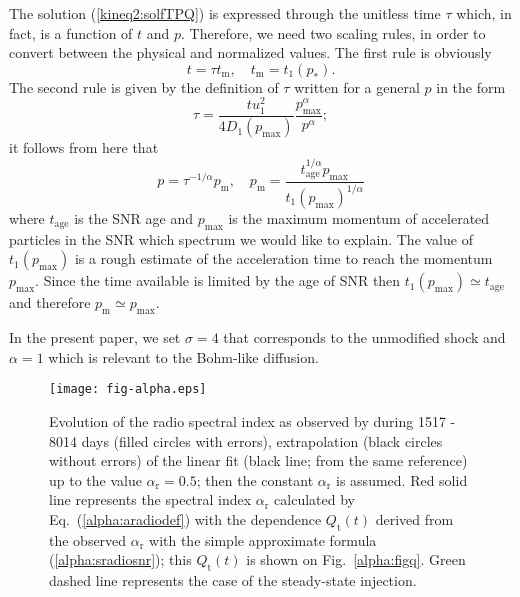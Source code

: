 \documentclass{aa}
\newcommand\rs[1]{_\mathrm{#1}}
\begin{document}
The solution (\ref{kineq2:solfTPQ}) is expressed through the unitless time $\tau$ which, in fact, is a function of $t$ and $p$. Therefore, we need two scaling rules, in order to convert between the physical and normalized values. The first rule is obviously  
\begin{equation}
 t=\tau t\rs{m}, \quad t\rs{m}=t_1(p\rs{*}).
 \label{alpha:tm}
\end{equation}  
The second rule is given by the definition of $\tau$ written for a general $p$ in the form
\begin{equation}
 \tau=\frac{tu_1^2}{4D_1(p\rs{max})}\frac{p\rs{max}^\alpha}{p^\alpha};
\end{equation} 
it follows from here that
\begin{equation}
 p=\tau^{-1/\alpha}p\rs{m},\quad p\rs{m}=\frac{t\rs{age}^{1/\alpha}p\rs{max}}{t_1(p\rs{max})^{1/\alpha}}
 \label{alpha:pm}
\end{equation} 
where $t\rs{age}$ is the SNR age and $p\rs{max}$ is the maximum momentum of accelerated particles in the SNR which spectrum we would like to explain.  
The value of $t_1(p\rs{max})$ is a rough estimate of the acceleration time to reach the momentum $p\rs{max}$. Since the time available is limited by the age of SNR then $t_1(p\rs{max})\simeq t\rs{age}$ and therefore $p\rs{m}\simeq p\rs{max}$.

In the present paper, we set $\sigma=4$ that corresponds to the unmodified shock and $\alpha=1$ which is relevant to the Bohm-like diffusion. 

\begin{figure}
 \centering
 \texttt{[image: fig-alpha.eps]}
 \caption{Evolution of the radio spectral index as observed by \citet{Zanardo-etal-2010} during 1517 - 8014 days (filled circles with errors), extrapolation (black circles without errors) of the linear fit (black line; from the same reference) up to the value $\alpha\rs{r}=0.5$; then the constant $\alpha\rs{r}$ is assumed. Red solid line represents the spectral index $\alpha\rs{r}$ calculated by Eq.~(\ref{alpha:aradiodef}) with the dependence $Q\rs{t}(t)$ derived from the observed $\alpha\rs{r}$ with the simple approximate formula (\ref{alpha:sradiosnr}); this $Q\rs{t}(t)$ is shown on Fig.~\ref{alpha:figq}. Green dashed line represents the case of the steady-state injection. 
               }
 \label{alpha:figalpha}
\end{figure}
\end{document}
